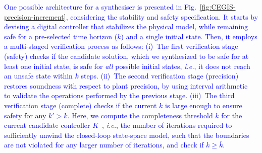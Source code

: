 \documentclass{cta-author}
\begin{document}
\textcolor{blue}{One possible architecture for a synthesiser is 
	presented in Fig.~\ref{fig:CEGIS-precision-increment}, considering the 
	stability and safety specification. It starts by devising a digital controller that 
	stabilizes the physical model, while remaining safe for a pre-selected time 
	horizon ($k$) and a single initial state. Then, it employs a multi-staged verification 
	process as follows: (i)~The first verification stage ({\sc safety}) checks if the candidate
	solution, which we synthesized to be safe for at least one initial
	state, is safe for \emph{all} possible initial states, {\it i.e.}, it does not reach
	an unsafe state within $k$ steps.
	(ii)~The second verification stage ({\sc precision})
	restores soundness with respect to plant precision,
	by using interval arithmetic~\cite{moore1966interval} to validate the 
	operations performed by the previous stage. 
	(iii)~The third verification stage ({\sc complete}) checks if the current
	$k$ is large enough to ensure safety for any $k'{>}k$. Here, we compute the
	completeness threshold $\overline{k}$ for the current candidate controller 
	$K$~\cite{abatecav2017}, {\it i.e.}, the number of
	iterations required to sufficiently unwind the closed-loop state-space
	model, such that the boundaries are not violated for any larger number of
	iterations, and check if $k{\geq}\overline{k}$}.
\end{document}
